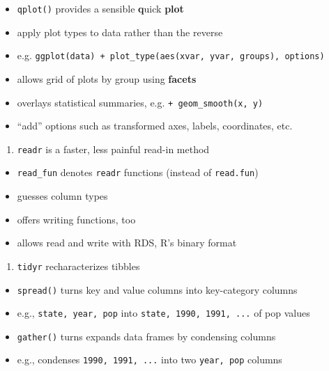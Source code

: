 \documentclass[]{book}
\providecommand{\tightlist}{%
  \setlength{\itemsep}{0pt}\setlength{\parskip}{0pt}}
\begin{document}
\begin{itemize}
\tightlist
\item
  \texttt{qplot()} provides a sensible \textbf{q}uick \textbf{plot}
\item
  apply plot types to data rather than the reverse
\item
  e.g.
  \texttt{ggplot(data)\ +\ plot\_type(aes(xvar,\ yvar,\ groups),\ options)}
\item
  allows grid of plots by group using \textbf{facets}
\item
  overlays statistical summaries, e.g. \texttt{+\ geom\_smooth(x,\ y)}
\item
  ``add'' options such as transformed axes, labels, coordinates, etc.
\end{itemize}

\begin{enumerate}
\def\labelenumi{\arabic{enumi}.}
\setcounter{enumi}{4}
\tightlist
\item
  \texttt{readr} is a faster, less painful read-in method
\end{enumerate}

\begin{itemize}
\tightlist
\item
  \texttt{read\_fun} denotes \texttt{readr} functions (instead of
  \texttt{read.fun})
\item
  guesses column types
\item
  offers writing functions, too
\item
  allows read and write with RDS, R's binary format
\end{itemize}

\begin{enumerate}
\def\labelenumi{\arabic{enumi}.}
\setcounter{enumi}{5}
\tightlist
\item
  \texttt{tidyr} recharacterizes tibbles
\end{enumerate}

\begin{itemize}
\tightlist
\item
  \texttt{spread()} turns key and value columns into key-category
  columns
\item
  e.g., \texttt{state,\ year,\ pop} into
  \texttt{state,\ 1990,\ 1991,\ ...} of pop values
\item
  \texttt{gather()} turns expands data frames by condensing columns
\item
  e.g., condenses \texttt{1990,\ 1991,\ ...} into two
  \texttt{year,\ pop} columns
\end{itemize}
\end{document}
